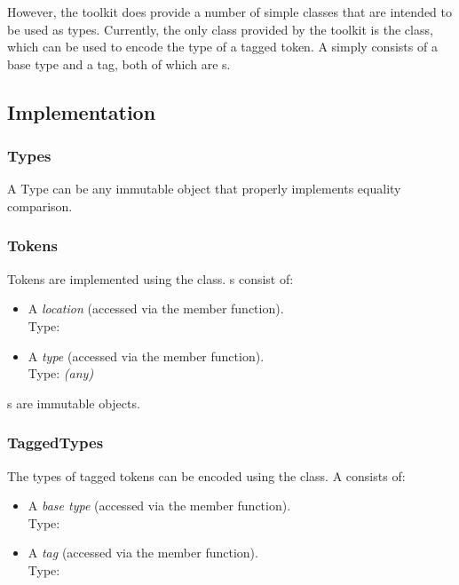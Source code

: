 \documentclass[11pt]{article}
\begin{document}
  However, the toolkit does provide a number of simple classes that
  are intended to be used as types.  Currently, the only class
  provided by the toolkit is the  class, which can be
  used to encode the type of a tagged token.  A 
  simply consists of a base type and a tag, both of which are
  s.

  \subsection{Implementation}

  \subsubsection{Types}
      A Type can be any immutable object that properly implements
      equality comparison.

  \subsubsection{Tokens}
      Tokens are implemented using the  class.
      s consist of:
  
      \begin{itemize}
    
        \item A \emph{location} (accessed via the  member
        function).  \\
        Type: 
    
        \item A \emph{type} (accessed via the  member
        function).  \\
        Type: \emph{(any)}
    
      \end{itemize}
      
      \noindent
      s are immutable objects.

  \subsubsection{TaggedTypes}
      \vspace{3mm}\noindent
      The types of tagged tokens can be encoded using the
       class.  A  consists of:
  
      \begin{itemize}
    
        \item A \emph{base type} (accessed via the 
        member function).  \\
        Type: 
    
        \item A \emph{tag} (accessed via the  member
        function).  \\
        Type: 
    
      \end{itemize}
      
\end{document}

